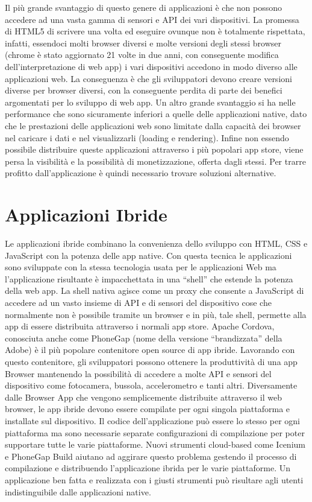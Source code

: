 Il più grande svantaggio di questo genere di applicazioni è che non possono accedere ad una vasta gamma di sensori e API dei vari dispositivi.
La promessa di HTML5 di scrivere una volta ed eseguire ovunque non è totalmente rispettata, infatti, essendoci molti browser diversi e molte versioni degli stessi browser (chrome è stato aggiornato 21 volte in due anni, con conseguente modifica dell'interpretazione di web app)\citep{White:Native-vs-Html} i vari dispositivi accedono in modo diverso alle applicazioni web.
La conseguenza è che gli sviluppatori devono creare versioni diverse per browser diversi, con la conseguente perdita di parte dei benefici argomentati per lo sviluppo di web app.
Un altro grande svantaggio si ha nelle performance che sono sicuramente inferiori a quelle delle applicazioni native, dato che le prestazioni delle applicazioni web sono limitate dalla capacità dei browser nel caricare i dati e nel visualizzarli (loading e rendering).
Infine non essendo possibile distribuire queste applicazioni attraverso i più popolari app store, viene persa la visibilità e la possibilità di monetizzazione, offerta dagli stessi.
Per trarre profitto dall'applicazione è quindi necessario trovare soluzioni alternative.
		
	\section{Applicazioni Ibride}
		Le applicazioni ibride combinano la convenienza dello sviluppo con HTML, CSS e JavaScript con la potenza delle app native. Con questa tecnica le applicazioni sono sviluppate con la stessa tecnologia usata per le applicazioni Web ma l'applicazione risultante è impacchettata in una “shell” che estende la potenza della web app. La shell nativa agisce come un proxy che consente a JavaScript di accedere ad un vasto insieme di API e di sensori del dispositivo cose che normalmente non è possibile tramite un browser e in più, tale shell, permette alla app di essere distribuita attraverso i normali app store.
Apache Cordova, conosciuta anche come PhoneGap (nome della versione “brandizzata” della Adobe) è il più popolare contenitore open source di app ibride. Lavorando con questo contenitore, gli sviluppatori possono ottenere la produttività di una app Browser mantenendo la possibilità di accedere a molte API e sensori del dispositivo come fotocamera, bussola, accelerometro e tanti altri.
Diversamente dalle Browser App che vengono semplicemente distribuite attraverso il web browser, le app ibride devono essere compilate per ogni singola piattaforma e installate sul dispositivo. Il codice dell'applicazione può essere lo stesso per ogni piattaforma ma sono necessarie separate  configurazioni di compilazione per poter supportare tutte le varie piattaforme. Nuovi strumenti cloud-based come Icenium e PhoneGap Build aiutano ad aggirare questo problema gestendo il processo di compilazione e distribuendo l'applicazione ibrida per le varie piattaforme.
Un applicazione ben fatta e realizzata con i giusti strumenti può risultare agli utenti indistinguibile dalle applicazioni native.
		
